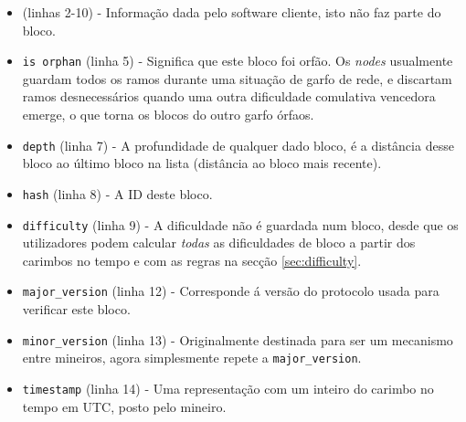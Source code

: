 \begin{appendices}
\begin{itemize}
	\item (linhas 2-10) - Informação dada pelo software cliente, isto não faz parte do bloco. 
    \item {\tt is orphan} (linha 5) - Significa que este bloco foi orfão. Os {\em nodes} usualmente guardam todos os ramos durante uma situação de garfo de rede, e discartam ramos desnecessários quando uma outra dificuldade comulativa vencedora emerge, o que torna os blocos do outro garfo órfaos.
    \item {\tt depth} (linha 7) - A profundidade de qualquer dado bloco, é a distância desse bloco ao último bloco na lista (distância ao bloco mais recente).
    \item {\tt hash} (linha 8) - A ID deste bloco.
    \item {\tt difficulty} (linha 9) - A dificuldade não é guardada num bloco, desde que os utilizadores podem calcular {\em todas} as dificuldades de bloco a partir dos carimbos no tempo e com as regras na secção \ref{sec:difficulty}. 
    \item {\tt major\_version} (linha 12) - Corresponde á versão do protocolo usada para verificar este bloco.
    \item {\tt minor\_version} (linha 13) - Originalmente destinada para ser um mecanismo entre mineiros, agora simplesmente repete a {\tt major\_version}. 
    \item {\tt timestamp} (linha 14) - Uma representação com um inteiro do carimbo no tempo em UTC, posto pelo mineiro.

\end{itemize}
\end{appendices}

